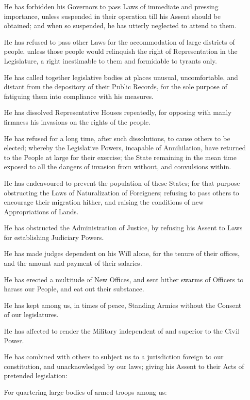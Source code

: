 \documentclass{article}
\begin{document}
He has forbidden his Governors to pass Laws of immediate
and pressing importance, unless suspended in their operation
till his Assent should be obtained; and when so suspended,
he has utterly neglected to attend to them.

He has refused to pass other Laws for the accommodation of
large districts of people, unless those people would relinquish
the right of Representation in the Legislature, a right
inestimable to them and formidable to tyrants only.

He has called together legislative bodies at places unusual,
uncomfortable, and distant from the depository of their
Public Records, for the sole purpose of fatiguing them
into compliance with his measures.

He has dissolved Representative Houses repeatedly, for opposing
with manly firmness his invasions on the rights of the people.

He has refused for a long time, after such dissolutions,
to cause others to be elected; whereby the Legislative Powers,
incapable of Annihilation, have returned to the People at large
for their exercise; the State remaining in the mean time exposed
to all the dangers of invasion from without, and convulsions within.

He has endeavoured to prevent the population of these States;
for that purpose obstructing the Laws of Naturalization of Foreigners;
refusing to pass others to encourage their migration hither,
and raising the conditions of new Appropriations of Lands.

He has obstructed the Administration of Justice, by refusing his Assent
to Laws for establishing Judiciary Powers.

He has made judges dependent on his Will alone, for the tenure
of their offices, and the amount and payment of their salaries.

He has erected a multitude of New Offices, and sent hither swarms of
Officers to harass our People, and eat out their substance.

He has kept among us, in times of peace, Standing Armies
without the Consent of our legislatures.

He has affected to render the Military independent of
and superior to the Civil Power.

He has combined with others to subject us to a jurisdiction
foreign to our constitution, and unacknowledged by our laws;
giving his Assent to their Acts of pretended legislation:

For quartering large bodies of armed troops among us:
\end{document}
